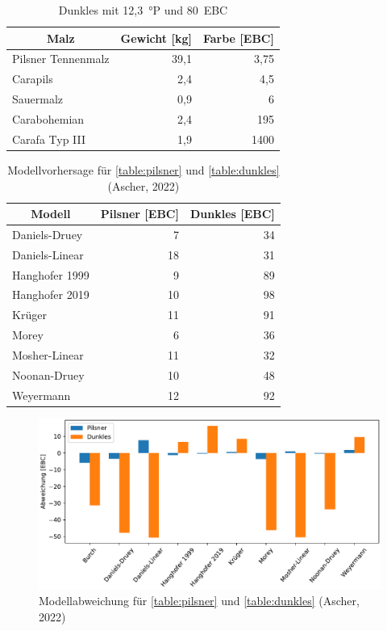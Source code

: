 \documentclass[a4paper,parskip=half]{scrartcl}
\begin{document}
\begin{table}[H]
\centering
\begin{tabular}{lrr}
\toprule
\multicolumn{1}{c}{\textbf{Malz}} & \multicolumn{1}{c}{\textbf{Gewicht [kg]}} & \multicolumn{1}{c}{\textbf{Farbe [EBC]}} \\
\midrule
Pilsner Tennenmalz & 39,1 & 3,75 \\
Carapils & 2,4 & 4,5 \\
Sauermalz & 0,9 & 6 \\
Carabohemian & 2,4 & 195 \\
Carafa Typ III & 1,9 & 1400 \\
\bottomrule
\end{tabular}
\caption{Dunkles mit 12,3~°P und 80~EBC \parencite{KrausWeyermann2022}}
\label{table:dunkles}
\end{table}


\begin{table}[H]
\centering
\begin{tabular}{lrr}
\toprule
\multicolumn{1}{c}{\textbf{Modell}} & \multicolumn{1}{c}{\textbf{Pilsner [EBC]}} & \multicolumn{1}{c}{\textbf{Dunkles [EBC]}} \\
\midrule
Daniels-Druey & 7 & 34 \\
Daniels-Linear & 18 & 31 \\
Hanghofer 1999 & 9 & 89 \\
Hanghofer 2019 & 10 & 98 \\
Krüger & 11 & 91 \\
Morey & 6 & 36 \\
Mosher-Linear & 11 & 32 \\
Noonan-Druey & 10 & 48 \\
Weyermann & 12 & 92 \\
\bottomrule
\end{tabular}
\caption{Modellvorhersage für \autoref{table:pilsner} und \autoref{table:dunkles} (Ascher, 2022)}
\label{table:modelcompare}
\end{table}

\begin{figure}[h]
\centering
\includegraphics[width=14cm]{graph_dev.pdf}
\caption{Modellabweichung für \autoref{table:pilsner} und \autoref{table:dunkles} (Ascher, 2022)}
\label{fig:modelcompare}
\end{figure}
\end{document}
